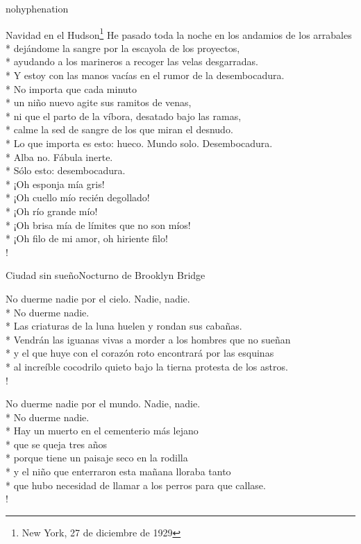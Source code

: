 \documentclass[
    a5paper,
    DIV=10,
    12pt,
    notitlepage,
    oneside,]
{scrbook} %
\begin{document}
\begin{hyphenrules}{nohyphenation}
\begin{poem}{Navidad en el Hudson}{\footnote{New York, 27 de diciembre de 1929}}{\vspace{-1em}}
He pasado toda la noche en los andamios de los arrabales\\*
dejándome la sangre por la escayola de los proyectos,\\*
ayudando a los marineros a recoger las velas desgarradas.\\*
Y estoy con las manos vacías en el rumor de la desembocadura.\\*
No importa que cada minuto\\*
un niño nuevo agite sus ramitos de venas,\\*
ni que el parto de la víbora, desatado bajo las ramas,\\*
calme la sed de sangre de los que miran el desnudo.\\*
Lo que importa es esto: hueco. Mundo solo. Desembocadura.\\*
Alba no. Fábula inerte.\\*
Sólo esto: desembocadura.\\*
¡Oh esponja mía gris!\\*
¡Oh cuello mío recién degollado!\\*
¡Oh río grande mío!\\*
¡Oh brisa mía de límites que no son míos!\\*
¡Oh filo de mi amor, oh hiriente filo! \\!

\end{poem}

\begin{poem}{Ciudad sin sueño}{Nocturno de Brooklyn Bridge}{}

No duerme nadie por el cielo. Nadie, nadie.\\*
No duerme nadie.\\*
Las criaturas de la luna huelen y rondan sus cabañas.\\*
Vendrán las iguanas vivas a morder a los hombres que no sueñan\\*
y el que huye con el corazón roto encontrará por las esquinas\\*
al increíble cocodrilo quieto bajo la tierna protesta de los astros.\\!

No duerme nadie por el mundo. Nadie, nadie.\\*
No duerme nadie.\\*
Hay un muerto en el cementerio más lejano\\*
que se queja tres años\\*
porque tiene un paisaje seco en la rodilla\\*
y el niño que enterraron esta mañana lloraba tanto\\*
que hubo necesidad de llamar a los perros para que callase.\\!


\end{poem}
\end{hyphenrules}
\end{document}
